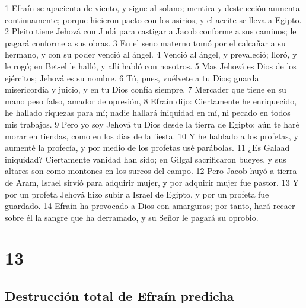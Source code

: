 1 Efraín se apacienta de viento, y sigue al solano; mentira y destrucción aumenta continuamente; porque hicieron pacto con los asirios, y el aceite se lleva a Egipto.
2 Pleito tiene Jehová con Judá para castigar a Jacob conforme a sus caminos; le pagará conforme a sus obras.
3 En el seno materno tomó por el calcañar a su hermano, y con su poder venció al ángel.
4 Venció al ángel, y prevaleció; lloró, y le rogó; en Bet-el le halló, y allí habló con nosotros.
5 Mas Jehová es Dios de los ejércitos; Jehová es su nombre.
6 Tú, pues, vuélvete a tu Dios; guarda misericordia y juicio, y en tu Dios confía siempre.
7 Mercader que tiene en su mano peso falso, amador de opresión,
8 Efraín dijo: Ciertamente he enriquecido, he hallado riquezas para mí; nadie hallará iniquidad en mí, ni pecado en todos mis trabajos.
9 Pero yo soy Jehová tu Dios desde la tierra de Egipto; aún te haré morar en tiendas, como en los días de la fiesta. 
10 Y he hablado a los profetas, y aumenté la profecía, y por medio de los profetas usé parábolas.
11 ¿Es Galaad iniquidad? Ciertamente vanidad han sido; en Gilgal sacrificaron bueyes, y sus altares son como montones en los surcos del campo.
12 Pero Jacob huyó a tierra de Aram, Israel sirvió para adquirir mujer, y por adquirir mujer fue pastor. 
13 Y por un profeta Jehová hizo subir a Israel de Egipto, y por un profeta fue guardado. 
14 Efraín ha provocado a Dios con amarguras; por tanto, hará recaer sobre él la sangre que ha derramado, y su Señor le pagará su oprobio.

\chapter{13}

\section*{Destrucción total de Efraín predicha}

